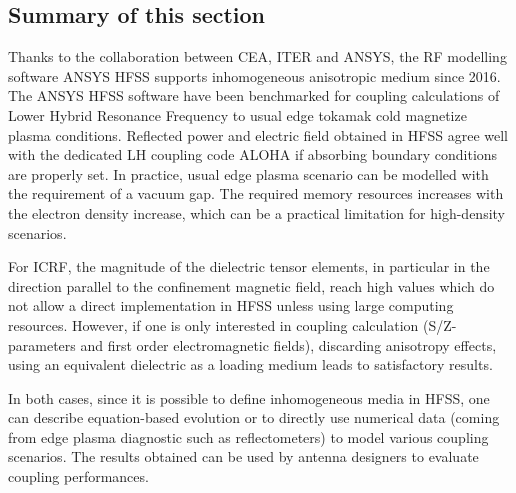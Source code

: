 
\subsection{Summary of this section}
Thanks to the collaboration between CEA, ITER and ANSYS, the RF modelling software ANSYS HFSS supports inhomogeneous anisotropic medium since 2016. The ANSYS HFSS software have been benchmarked for coupling calculations of Lower Hybrid Resonance Frequency to usual edge tokamak cold magnetize plasma conditions. Reflected power and electric field obtained in HFSS agree well with the dedicated LH coupling code ALOHA if absorbing boundary conditions are properly set. In practice, usual edge plasma scenario can be modelled with the requirement of a vacuum gap. The  required memory resources increases with the electron density increase, which can be a practical limitation for high-density scenarios.

For ICRF, the magnitude of the dielectric tensor elements, in particular in the direction parallel to the confinement magnetic field, reach high values which do not allow a direct implementation in HFSS unless using large computing resources. However, if one is only interested in coupling calculation (S/Z-parameters and first order electromagnetic fields), discarding anisotropy effects, using an equivalent dielectric as a loading medium leads to satisfactory results. 

In both cases, since it is possible to define inhomogeneous media in HFSS, one can describe equation-based evolution or to directly use numerical data (coming from edge plasma diagnostic such as reflectometers) to model various coupling scenarios. The results obtained can be used by antenna designers to evaluate coupling performances. 

